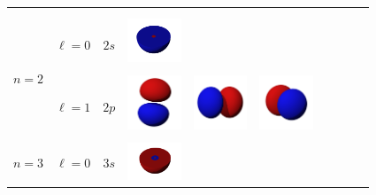 \begin{landscape}
\begin{xltabular}{\linewidth}{C C C c c c c c c c}
& & & & & & \\

& & &  & & & & & &  \\ %

\midrule %

 &  &  & 
\includegraphics[width=1.6cm]{tableau_geometrie_orbitale_modelisation/S2M0.png} 
& & & & & & \\

& & &  & & & & & &  \\ %

\addlinespace

&  &  & 
\includegraphics[width=1.6cm]{tableau_geometrie_orbitale_modelisation/Pz_orbital.png} 
&
\includegraphics[width=1.6cm]{tableau_geometrie_orbitale_modelisation/Px_orbital.png}  
&
\includegraphics[width=1.6cm]{tableau_geometrie_orbitale_modelisation/Py_orbital.png} 
& & & & \\

& & &  &  &  & & & &  \\ %

\midrule %

 &  &  & 
\includegraphics[width=1.6cm]{tableau_geometrie_orbitale_modelisation/S3M0.png} 
& & & & & & \\


\end{xltabular}
\end{landscape}
